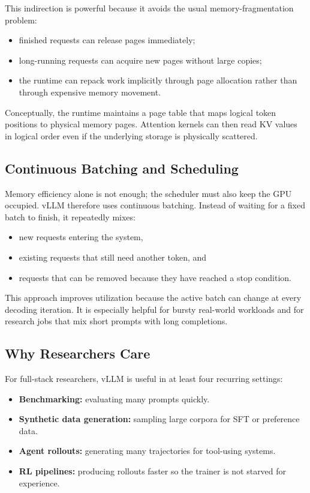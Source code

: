 \documentclass[class=article,crop=false]{standalone}
\begin{document}
This indirection is powerful because it avoids the usual memory-fragmentation problem:
\begin{itemize}
  \item finished requests can release pages immediately;
  \item long-running requests can acquire new pages without large copies;
  \item the runtime can repack work implicitly through page allocation rather than through expensive memory movement.
\end{itemize}

Conceptually, the runtime maintains a page table that maps logical token positions to physical memory pages. Attention kernels can then read KV values in logical order even if the underlying storage is physically scattered.

\subsection{Continuous Batching and Scheduling}
\label{sec:vllm:scheduling}

Memory efficiency alone is not enough; the scheduler must also keep the GPU occupied. vLLM therefore uses continuous batching. Instead of waiting for a fixed batch to finish, it repeatedly mixes:
\begin{itemize}
  \item new requests entering the system,
  \item existing requests that still need another token, and
  \item requests that can be removed because they have reached a stop condition.
\end{itemize}

This approach improves utilization because the active batch can change at every decoding iteration. It is especially helpful for bursty real-world workloads and for research jobs that mix short prompts with long completions.

\subsection{Why Researchers Care}
\label{sec:vllm:research}

For full-stack researchers, vLLM is useful in at least four recurring settings:
\begin{itemize}
  \item \textbf{Benchmarking:} evaluating many prompts quickly.
  \item \textbf{Synthetic data generation:} sampling large corpora for SFT or preference data.
  \item \textbf{Agent rollouts:} generating many trajectories for tool-using systems.
  \item \textbf{RL pipelines:} producing rollouts faster so the trainer is not starved for experience.
\end{itemize}
\end{document}
